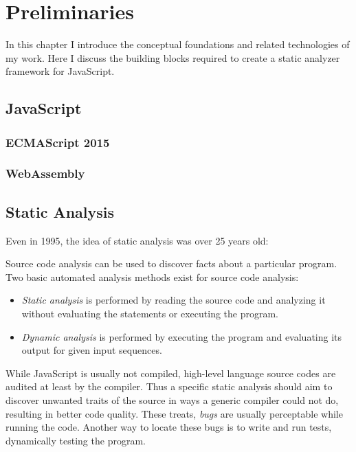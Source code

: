 \chapter{Preliminaries}
\label{chap:preliminaries}

In this chapter I introduce the conceptual foundations and related technologies of my work. Here I discuss the building blocks required to create a static analyzer framework for JavaScript.

\section{JavaScript}
\subsection{ECMAScript 2015}
\subsection{WebAssembly}


\section{Static Analysis}
Even in 1995, the idea of static analysis was over 25 years old: 

Source code analysis can be used to discover facts about a particular program. Two basic automated analysis methods exist for source code analysis:
\begin{itemize}[topsep=0pt]
  \item \emph{Static analysis} is performed by reading the source code and analyzing it without evaluating the statements or executing the program.
  \item \emph{Dynamic analysis} is performed by executing the program and evaluating its output for given input sequences.
\end{itemize}


While JavaScript is usually not compiled, high-level language source codes are audited at least by the compiler. Thus a specific static analysis should aim to discover unwanted traits of the source in ways a generic compiler could not do, resulting in better code quality. These treats, \emph{bugs} are usually perceptable while running the code. Another way to locate these bugs is to write and run tests, dynamically testing the program.

